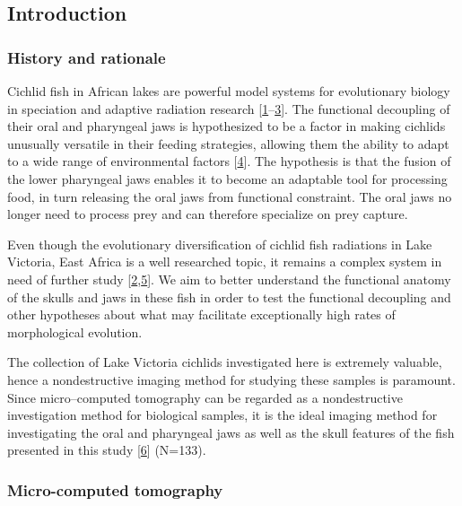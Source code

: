 \hypertarget{introduction}{%
\subsection{Introduction}\label{introduction}}

\hypertarget{history-and-rationale}{%
\subsubsection{History and rationale}\label{history-and-rationale}}

Cichlid fish in African lakes are powerful model systems for evolutionary biology in speciation and adaptive radiation research {[}\protect\hyperlink{ref-TUQFenhc}{1}--\protect\hyperlink{ref-WVIa4CH0}{3}{]}.
The functional decoupling of their oral and pharyngeal jaws is hypothesized to be a factor in making cichlids unusually versatile in their feeding strategies, allowing them the ability to adapt to a wide range of environmental factors {[}\protect\hyperlink{ref-1GEljkDsf}{4}{]}.
The hypothesis is that the fusion of the lower pharyngeal jaws enables it to become an adaptable tool for processing food, in turn releasing the oral jaws from functional constraint.
The oral jaws no longer need to process prey and can therefore specialize on prey capture.

Even though the evolutionary diversification of cichlid fish radiations in Lake Victoria, East Africa is a well researched topic, it remains a complex system in need of further study {[}\protect\hyperlink{ref-W2f2SDjn}{2},\protect\hyperlink{ref-c3poTogo}{5}{]}.
We aim to better understand the functional anatomy of the skulls and jaws in these fish in order to test the functional decoupling and other hypotheses about what may facilitate exceptionally high rates of morphological evolution.

The collection of Lake Victoria cichlids investigated here is extremely valuable, hence a nondestructive imaging method for studying these samples is paramount.
Since micro--computed tomography can be regarded as a nondestructive investigation method for biological samples, it is the ideal imaging method for investigating the oral and pharyngeal jaws as well as the skull features of the fish presented in this study {[}\protect\hyperlink{ref-19h9vxsYG}{6}{]} (N=133).

\hypertarget{micro-computed-tomography}{%
\subsubsection{Micro-computed tomography}\label{micro-computed-tomography}}


